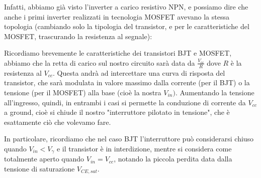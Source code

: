 \documentclass[a4paper,11pt]{article}
\begin{document}
Infatti, abbiamo già visto l'inverter a carico resistivo NPN, e possiamo dire che anche i primi inverter realizzati in tecnologia MOSFET avevano la stessa topologia (cambiando solo la tipologia del transistor, e per le caratteristiche del MOSFET, trascurando la resistenza al segnale):
\begin{center}
\end{center}

Ricordiamo brevemente le caratteristiche dei transistori BJT e MOSFET, abbiamo che la retta di carico sul nostro circuito sarà data da  $\frac{V_{cc}}{R}$ dove $R$ è la resistenza al $V_{cc}$. Questa andrà ad intercettare una curva di risposta del transistor, che sarà modulata in valore massimo dalla corrente (per il BJT) o la tensione (per il MOSFET) alla base (cioè la nostra $V_{in})$. Aumentando la tensione all'ingresso, quindi, in entrambi i casi si permette la conduzione di corrente da $V_{cc}$ a ground, cioè si chiude il nostro "interruttore pilotato in tensione", che è esattamente ciò che volevamo fare.

In particolare, ricordiamo che nel caso BJT l'interruttore può considerarsi chiuso quando $V_{in} < V_\gamma$ e il transistor è in interdizione, mentre si considera come totalmente aperto quando $V_{in} = V_{cc}$, notando la piccola perdita data dalla tensione di saturazione $V_{CE,sat}$.
\end{document}
